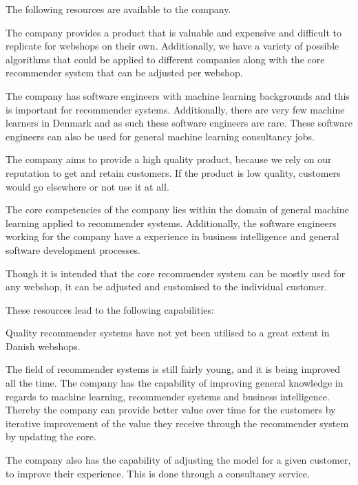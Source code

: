 The following resources are available to the company.
\begin{description}[style=nextline]
\item[Software Product]
The company provides a product that is valuable and expensive and difficult to replicate for webshops on their own. 
Additionally, we have a variety of possible algorithms that could be applied to different companies along with the core recommender system that can be adjusted per webshop.
\item[People \& Talent]
The company has software engineers with machine learning backgrounds and this is important for recommender systems. 
Additionally, there are very few machine learners in Denmark and as such these software engineers are rare. 
These software engineers can also be used for general machine learning consultancy jobs.
\item[Core Values]
The company aims to provide a high quality product, because we rely on our reputation to get and retain customers. 
If the product is low quality, customers would go elsewhere or not use it at all. 
\item[Knowledge]
The core competencies of the company lies within the domain of general machine learning applied to recommender systems. 
Additionally, the software engineers working for the company have a experience in business intelligence and general software development processes.
\item[Increased Capabilities]
Though it is intended that the core recommender system can be mostly used for any webshop, it can be adjusted and customised to the individual customer.
\end{description}
\noindent
These resources lead to the following capabilities:
\begin{description}[style=nextline]
\item[Provide quality recommender systems]
Quality recommender systems have not yet been utilised to a great extent in Danish webshops.
\item[Improvement of knowledge base]
The field of recommender systems is still fairly young, and it is being improved all the time. 
The company has the capability of improving general knowledge in regards to machine learning, recommender systems and business intelligence. 
Thereby the company can provide better value over time for the customers by iterative improvement of the value they receive through the recommender system by updating the core.
\item[Response to Customer Needs]
The company also has the capability of adjusting the model for a given customer, to improve their experience. This is done through a consultancy service.
\end{description}

